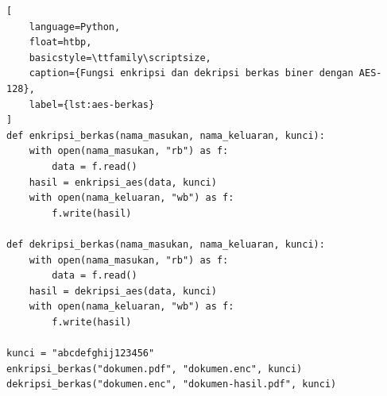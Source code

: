 \begin{lstlisting}[
    language=Python,
    float=htbp,
    basicstyle=\ttfamily\scriptsize,
    caption={Fungsi enkripsi dan dekripsi berkas biner dengan AES-128},
    label={lst:aes-berkas}
]
def enkripsi_berkas(nama_masukan, nama_keluaran, kunci):
    with open(nama_masukan, "rb") as f:
        data = f.read()
    hasil = enkripsi_aes(data, kunci)
    with open(nama_keluaran, "wb") as f:
        f.write(hasil)

def dekripsi_berkas(nama_masukan, nama_keluaran, kunci):
    with open(nama_masukan, "rb") as f:
        data = f.read()
    hasil = dekripsi_aes(data, kunci)
    with open(nama_keluaran, "wb") as f:
        f.write(hasil)

kunci = "abcdefghij123456"
enkripsi_berkas("dokumen.pdf", "dokumen.enc", kunci)
dekripsi_berkas("dokumen.enc", "dokumen-hasil.pdf", kunci)
\end{lstlisting}

